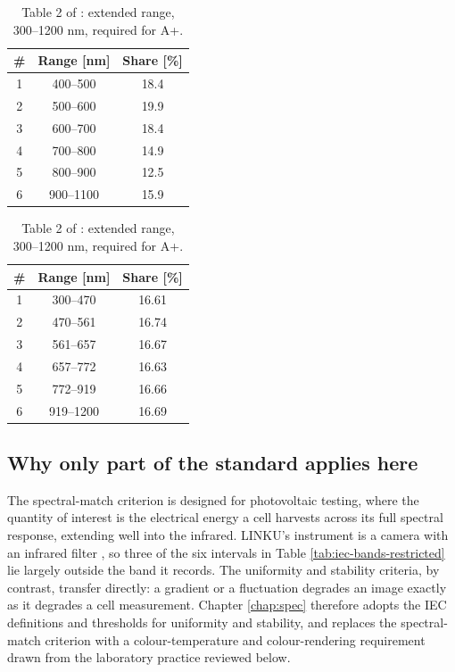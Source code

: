 \begin{table}[!ht]
\centering
\small
\begin{minipage}[t]{0.48\textwidth}
\centering
\caption[AM1.5G intervals, restricted range]{Table 1 of \cite{iec60904_9_2020}: restricted range, 400--1100 nm.}
\label{tab:iec-bands-restricted}
\begin{tabular}{ccc}
\toprule
\textbf{\#} & \textbf{Range [nm]} & \textbf{Share [\%]} \\
\midrule
1 & 400--500   & 18.4 \\
2 & 500--600   & 19.9 \\
3 & 600--700   & 18.4 \\
4 & 700--800   & 14.9 \\
5 & 800--900   & 12.5 \\
6 & 900--1100  & 15.9 \\
\bottomrule
\end{tabular}
\end{minipage}
\hfill
\begin{minipage}[t]{0.48\textwidth}
\centering
\caption[AM1.5G intervals, extended range]{Table 2 of \cite{iec60904_9_2020}: extended range, 300--1200 nm, required for A+.}
\label{tab:iec-bands-ext}
\begin{tabular}{ccc}
\toprule
\textbf{\#} & \textbf{Range [nm]} & \textbf{Share [\%]} \\
\midrule
1 & 300--470   & 16.61 \\
2 & 470--561   & 16.74 \\
3 & 561--657   & 16.67 \\
4 & 657--772   & 16.63 \\
5 & 772--919   & 16.66 \\
6 & 919--1200  & 16.69 \\
\bottomrule
\end{tabular}
\end{minipage}
\end{table}

\subsection{Why only part of the standard applies here}

The spectral-match criterion is designed for photovoltaic testing, where the quantity of interest is the electrical energy a cell harvests across its full spectral response, extending well into the infrared. LINKU's instrument is a camera with an infrared filter \cite{raspberrypi_camera_docs}, so three of the six intervals in Table \ref{tab:iec-bands-restricted} lie largely outside the band it records. The uniformity and stability criteria, by contrast, transfer directly: a gradient or a fluctuation degrades an image exactly as it degrades a cell measurement. Chapter \ref{chap:spec} therefore adopts the IEC definitions and thresholds for uniformity and stability, and replaces the spectral-match criterion with a colour-temperature and colour-rendering requirement drawn from the laboratory practice reviewed below.

